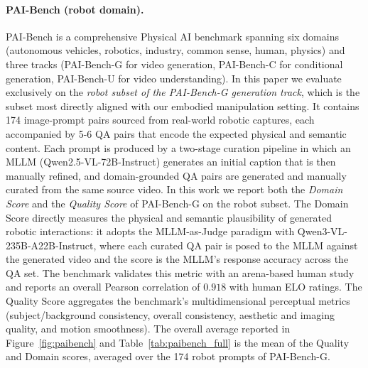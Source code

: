 \documentclass{llmxive}
\providecommand{\emph}[1]{\textit{#1}}
\begin{document}
\paragraph{PAI-Bench (robot domain).}
PAI-Bench is a comprehensive Physical AI benchmark spanning six domains (autonomous
vehicles, robotics, industry, common sense, human, physics) and three tracks (PAI-Bench-G
for video generation, PAI-Bench-C for conditional generation, PAI-Bench-U for video
understanding). In this paper we evaluate exclusively on the \emph{robot subset of the
PAI-Bench-G generation track}, which is the subset most directly aligned with our embodied
manipulation setting. It contains 174 image-prompt pairs sourced from real-world robotic
captures, each accompanied by 5-6 QA pairs that encode the expected physical and
semantic content. Each prompt is produced by a two-stage curation pipeline in which an
MLLM (Qwen2.5-VL-72B-Instruct) generates an initial caption that is then manually
refined, and domain-grounded QA pairs are generated and manually curated from the same
source video. In this work we report both the \emph{Domain Score} and the \emph{Quality Score} of
PAI-Bench-G on the robot subset. The Domain Score directly measures the physical and
semantic plausibility of generated robotic interactions: it adopts the MLLM-as-Judge
paradigm with Qwen3-VL-235B-A22B-Instruct, where each curated QA pair is posed to the MLLM
against the generated video and the score is the MLLM's response accuracy across the QA
set. The benchmark validates this metric with an arena-based human study and reports an
overall Pearson correlation of $0.918$ with human ELO ratings. The Quality Score
aggregates the benchmark's multidimensional perceptual metrics (subject/background
consistency, overall consistency, aesthetic and imaging quality, and motion smoothness).
The overall average reported in Figure~\ref{fig:paibench} and Table~\ref{tab:paibench_full}
is the mean of the Quality and Domain scores, averaged over the 174 robot prompts of
PAI-Bench-G.
\end{document}

